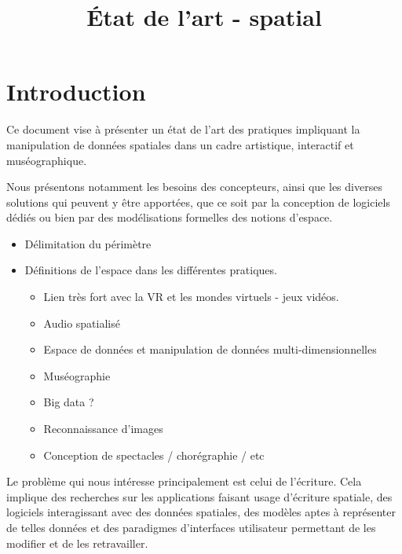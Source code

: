 \documentclass[french,12pt]{article}
\title{État de l'art - spatial}
\begin{document}
\maketitle
\newpage
\tableofcontents
\newpage

\section{Introduction}
Ce document vise à présenter un état de l'art des pratiques impliquant la manipulation de 
données spatiales dans un cadre artistique, interactif et muséographique.

Nous présentons notamment les besoins des concepteurs, ainsi que les diverses solutions qui 
peuvent y être apportées, que ce soit par la conception de logiciels dédiés ou bien 
par des modélisations formelles des notions d'espace.
 
\begin{itemize}
    
\item Délimitation du périmètre
 
\item Définitions de l'espace dans les différentes pratiques.
 
 \begin{itemize}
  \item Lien très fort avec la VR et les mondes virtuels - jeux vidéos.
  \item Audio spatialisé   %
  \item Espace de données et manipulation de données multi-dimensionnelles
  \item Muséographie
  \item Big data ?
  \item Reconnaissance d'images 
  \item Conception de spectacles / chorégraphie / etc
\end{itemize}

\end{itemize}

  
Le problème qui nous intéresse principalement est celui de l'écriture. Cela implique des recherches sur les applications faisant usage d'écriture spatiale, des logiciels interagissant avec des données spatiales, des modèles aptes à représenter de telles données et des paradigmes d'interfaces utilisateur permettant de les modifier et de les retravailler. 


\newpage
\end{document}
